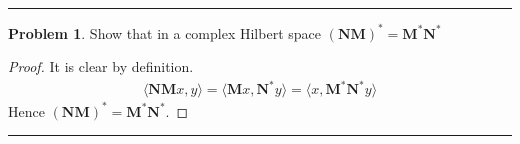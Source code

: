 \documentclass[a4paper, 10pt]{article}
\theoremstyle{definition}
\newtheorem{problem}{Problem}
\theoremstyle{hSol}
\begin{document}
\noindent\rule{16cm}{0.4pt}
\begin{problem} Show that in a complex Hilbert space $(\bm{NM})^* = \bm{M}^* \bm{N}^*$
\end{problem}
\begin{proof} It is clear by definition.
\begin{equation}
	\begin{split}
		\langle \bm{NM}x, y \rangle = \langle \bm{M}x, \bm{N}^* y \rangle = \langle x,  \bm{M}^*\bm{N}^*y\rangle
	\end{split}
\end{equation}
Hence $(\bm{NM})^* = \bm{M}^*\bm{N}^*$.
\end{proof}

\noindent\rule{16cm}{0.4pt}
\end{document}
